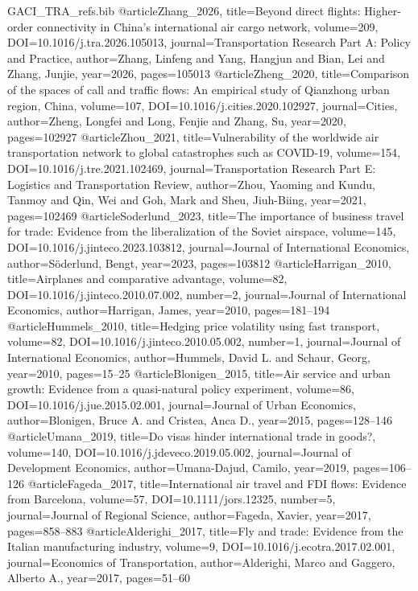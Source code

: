 \begin{filecontents*}[overwrite]{GACI_TRA_refs.bib}
@article{Zhang_2026, title={Beyond direct flights: Higher-order connectivity in China's international air cargo network}, volume={209}, DOI={10.1016/j.tra.2026.105013}, journal={Transportation Research Part A: Policy and Practice}, author={Zhang, Linfeng and Yang, Hangjun and Bian, Lei and Zhang, Junjie}, year={2026}, pages={105013} }
@article{Zheng_2020, title={Comparison of the spaces of call and traffic flows: An empirical study of Qianzhong urban region, China}, volume={107}, DOI={10.1016/j.cities.2020.102927}, journal={Cities}, author={Zheng, Longfei and Long, Fenjie and Zhang, Su}, year={2020}, pages={102927} }
@article{Zhou_2021, title={Vulnerability of the worldwide air transportation network to global catastrophes such as COVID-19}, volume={154}, DOI={10.1016/j.tre.2021.102469}, journal={Transportation Research Part E: Logistics and Transportation Review}, author={Zhou, Yaoming and Kundu, Tanmoy and Qin, Wei and Goh, Mark and Sheu, Jiuh-Biing}, year={2021}, pages={102469} }
@article{Soderlund_2023, title={The importance of business travel for trade: Evidence from the liberalization of the Soviet airspace}, volume={145}, DOI={10.1016/j.jinteco.2023.103812}, journal={Journal of International Economics}, author={S\"oderlund, Bengt}, year={2023}, pages={103812} }
@article{Harrigan_2010, title={Airplanes and comparative advantage}, volume={82}, DOI={10.1016/j.jinteco.2010.07.002}, number={2}, journal={Journal of International Economics}, author={Harrigan, James}, year={2010}, pages={181--194} }
@article{Hummels_2010, title={Hedging price volatility using fast transport}, volume={82}, DOI={10.1016/j.jinteco.2010.05.002}, number={1}, journal={Journal of International Economics}, author={Hummels, David L. and Schaur, Georg}, year={2010}, pages={15--25} }
@article{Blonigen_2015, title={Air service and urban growth: Evidence from a quasi-natural policy experiment}, volume={86}, DOI={10.1016/j.jue.2015.02.001}, journal={Journal of Urban Economics}, author={Blonigen, Bruce A. and Cristea, Anca D.}, year={2015}, pages={128--146} }
@article{Umana_2019, title={Do visas hinder international trade in goods?}, volume={140}, DOI={10.1016/j.jdeveco.2019.05.002}, journal={Journal of Development Economics}, author={Umana-Dajud, Camilo}, year={2019}, pages={106--126} }
@article{Fageda_2017, title={International air travel and FDI flows: Evidence from Barcelona}, volume={57}, DOI={10.1111/jors.12325}, number={5}, journal={Journal of Regional Science}, author={Fageda, Xavier}, year={2017}, pages={858--883} }
@article{Alderighi_2017, title={Fly and trade: Evidence from the Italian manufacturing industry}, volume={9}, DOI={10.1016/j.ecotra.2017.02.001}, journal={Economics of Transportation}, author={Alderighi, Marco and Gaggero, Alberto A.}, year={2017}, pages={51--60} }

\end{filecontents*}
